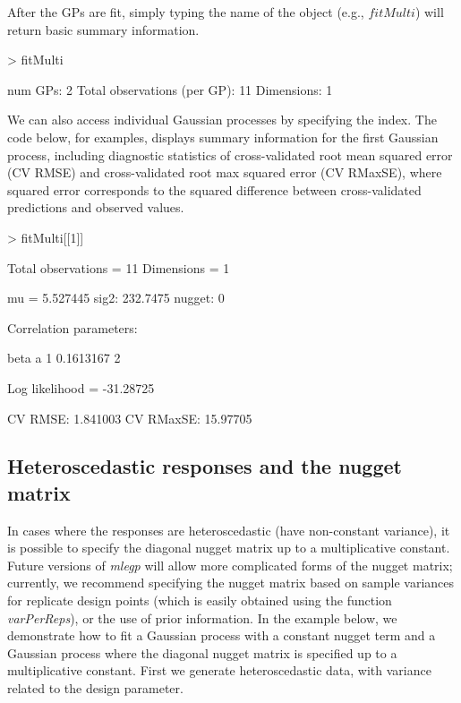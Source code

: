 After the GPs are fit, simply typing the name of the object (e.g., $fitMulti$) will return basic summary information. 
\begin{Schunk}
\begin{Sinput}
> fitMulti
\end{Sinput}
\begin{Soutput}
num GPs: 2
Total observations (per GP): 11
Dimensions: 1
\end{Soutput}
\end{Schunk}
We can also access individual Gaussian processes by specifying the index. The code below, for examples, displays summary information for the first Gaussian process, including diagnostic statistics of cross-validated root mean squared error (CV RMSE) and cross-validated root max squared error (CV RMaxSE), where squared error corresponds to the squared difference between cross-validated predictions and observed values.
\begin{Schunk}
\begin{Sinput}
> fitMulti[[1]]
\end{Sinput}
\begin{Soutput}
Total observations = 11
Dimensions = 1

mu = 5.527445
sig2:	232.7475
nugget:	0

Correlation parameters:

       beta a
1 0.1613167 2

Log likelihood = -31.28725

CV RMSE: 1.841003
CV RMaxSE: 15.97705
\end{Soutput}
\end{Schunk}
\subsection{Heteroscedastic responses and the nugget matrix}
In cases where the responses are heteroscedastic (have non-constant variance), it is possible to specify the diagonal nugget matrix up to a multiplicative constant. Future versions of {\it mlegp} will allow more complicated forms of the nugget matrix; currently, we recommend specifying the nugget matrix based on sample variances for replicate design points (which is easily obtained using the function {\it varPerReps}), or the use of prior information. In the example below, we demonstrate how to fit a Gaussian process with a constant nugget term and a Gaussian process where the diagonal nugget matrix is specified up to a multiplicative constant. First we generate heteroscedastic data, with variance related to the design parameter.   

